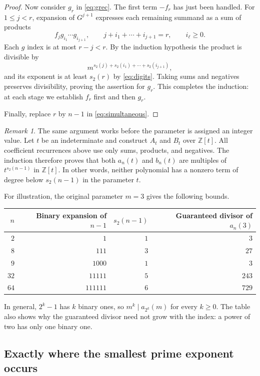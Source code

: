 \documentclass[11pt,a4paper]{article}
\theoremstyle{remark}\newtheorem{remark}[theorem]{Remark}
\newcommand{\Z}{\mathbb Z}
\begin{document}
\begin{proof}
Now consider $g_r$ in \eqref{eq:grec}. The first term $-f_r$ has just
been handled. For $1\le j<r$, expansion of $G^{j+1}$ expresses each
remaining summand as a sum of products
\[
 f_jg_{i_1}\cdots g_{i_{j+1}},\qquad
 j+i_1+\cdots+i_{j+1}=r,
 \qquad i_\ell\ge0.
\]
Each $g$ index is at most $r-j<r$. By the induction hypothesis the product
is divisible by
\[
 m^{s_2(j)+s_2(i_1)+\cdots+s_2(i_{j+1})},
\]
and its exponent is at least $s_2(r)$ by \eqref{eq:digits}.
Taking sums and negatives preserves divisibility, proving the assertion
for $g_r$. This completes the induction: at each stage we establish $f_r$
first and then $g_r$.

Finally, replace $r$ by $n-1$ in \eqref{eq:simultaneous}.
\end{proof}

\begin{remark}\label{rem:polynomial}
The same argument works before the parameter is assigned an integer value.
Let $t$ be an indeterminate and construct $A_t$ and $B_t$ over $\Z[t]$.
All coefficient recurrences above use only sums, products, and negatives. The induction
therefore proves that both $a_n(t)$ and $b_n(t)$ are multiples of
$t^{s_2(n-1)}$ in $\Z[t]$. In other words, neither polynomial has a
nonzero term of degree below $s_2(n-1)$ in the parameter $t$.
\end{remark}

For illustration, the original parameter $m=3$ gives the following bounds.
\begin{center}
\begin{tabular}{@{}rrrr@{}}
\toprule
$n$ & Binary expansion of $n-1$ & $s_2(n-1)$ & Guaranteed divisor of $a_n(3)$\\
\midrule
$2$ & $1$ & $1$ & $3$\\
$8$ & $111$ & $3$ & $27$\\
$9$ & $1000$ & $1$ & $3$\\
$32$ & $11111$ & $5$ & $243$\\
$64$ & $111111$ & $6$ & $729$\\
\bottomrule
\end{tabular}
\end{center}
In general, $2^k-1$ has $k$ binary ones, so
$m^k\mid a_{2^k}(m)$ for every $k\ge0$. The table also shows why the
guaranteed divisor need not grow with the index: a power of two has only
one binary one.

\subsection{Exactly where the smallest prime exponent occurs}
\end{document}
